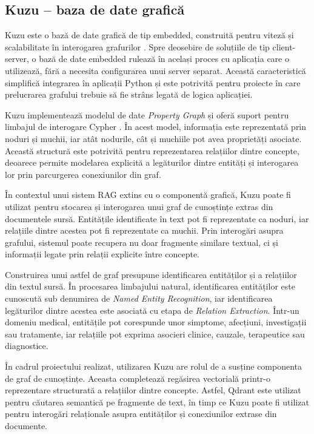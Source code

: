 \documentclass[12pt, a4paper, oneside, romanian]{teza-upb}
\begin{document}
\subsection{Kuzu -- baza de date grafică}

Kuzu este o bază de date grafică de tip embedded, construită pentru viteză și scalabilitate în interogarea grafurilor \cite{kuzu_doc}. Spre deosebire de soluțiile de tip client-server, o bază de date embedded rulează în același proces cu aplicația care o utilizează, fără a necesita configurarea unui server separat. Această caracteristică simplifică integrarea în aplicații Python și este potrivită pentru proiecte în care prelucrarea grafului trebuie să fie strâns legată de logica aplicației.

Kuzu implementează modelul de date \textit{Property Graph} și oferă suport pentru limbajul de interogare Cypher \cite{kuzu_doc,kuzu_cidr}. În acest model, informația este reprezentată prin noduri și muchii, iar atât nodurile, cât și muchiile pot avea proprietăți asociate. Această structură este potrivită pentru reprezentarea relațiilor dintre concepte, deoarece permite modelarea explicită a legăturilor dintre entități și interogarea lor prin parcurgerea conexiunilor din graf.

În contextul unui sistem RAG extins cu o componentă grafică, Kuzu poate fi utilizat pentru stocarea și interogarea unui graf de cunoștințe extras din documentele sursă. Entitățile identificate în text pot fi reprezentate ca noduri, iar relațiile dintre acestea pot fi reprezentate ca muchii. Prin interogări asupra grafului, sistemul poate recupera nu doar fragmente similare textual, ci și informații legate prin relații explicite între concepte.

Construirea unui astfel de graf presupune identificarea entităților și a relațiilor din textul sursă. În procesarea limbajului natural, identificarea entităților este cunoscută sub denumirea de \textit{Named Entity Recognition}, iar identificarea legăturilor dintre acestea este asociată cu etapa de \textit{Relation Extraction}. Într-un domeniu medical, entitățile pot corespunde unor simptome, afecțiuni, investigații sau tratamente, iar relațiile pot exprima asocieri clinice, cauzale, terapeutice sau diagnostice.

În cadrul proiectului realizat, utilizarea Kuzu are rolul de a susține componenta de graf de cunoștințe. Aceasta completează regăsirea vectorială printr-o reprezentare structurată a relațiilor dintre concepte. Astfel, Qdrant este utilizat pentru căutarea semantică pe fragmente de text, în timp ce Kuzu poate fi utilizat pentru interogări relaționale asupra entităților și conexiunilor extrase din documente.
\end{document}
